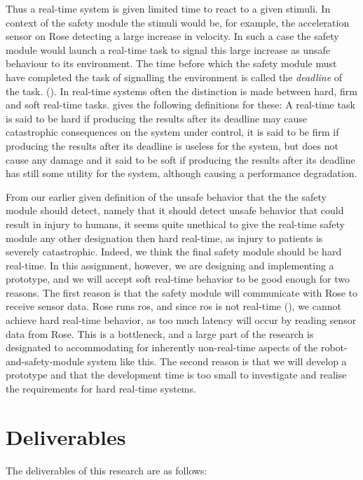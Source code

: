 \documentclass[12pt]{scrreprt}
\begin{document}
Thus a real-time system is given limited time to react to a given stimuli. In context of the safety module the stimuli would be, for example, the acceleration sensor on Rose detecting a large increase in velocity. In such a case the safety module would launch a real-time task to signal this large increase as unsafe behaviour to its environment. The time before which the safety module must have completed the task of signalling the environment is called the \textit{deadline} of the task. (\cite{realtime_systems}). In real-time systems often the distinction is made between hard, firm and soft real-time tasks. \cite{buttazo} gives the following definitions for these: A real-time task is said to be hard if producing the results after its deadline
may cause catastrophic consequences on the system under control, it is said to be firm if producing the results after its deadline is useless for the system, but does not cause any damage and it said to be soft if producing the results after its deadline has still some utility for the system, although causing a performance degradation.
\par
From our earlier given definition of the unsafe behavior that the the safety module should detect, namely that it should detect unsafe behavior that could result in injury to humans, it seems quite unethical to give the real-time safety module any other designation then hard real-time, as injury to patients is severely catastrophic. Indeed, we think the final safety module should be hard real-time. In this assignment, however, we are designing and implementing a prototype, and we will accept soft real-time behavior to be good enough for two reasons. The first reason is that the safety module will communicate with Rose to receive sensor data. Rose runs \acrfull{ros}, and since \acrlong{ros} is not real-time (\cite{why_is_ros_not_realtime}), we cannot achieve hard real-time behavior, as too much latency will occur by reading sensor data from Rose. This is a bottleneck, and a large part of the research is designated to accommodating for inherently non-real-time aspects of the robot-and-safety-module system like this. The second reason is that we will develop a prototype and that the development time is too small to investigate and realise the requirements for hard real-time systems.

\section{Deliverables}
\label{Deliverables}
The deliverables of this research are as follows:
\end{document}
